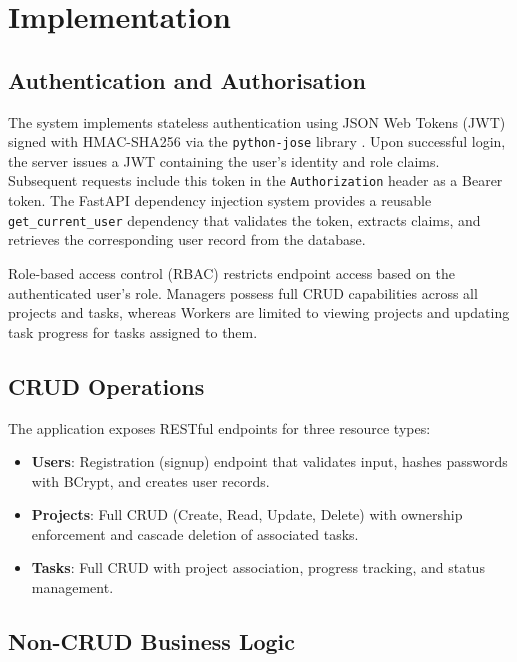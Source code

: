 \documentclass[conference]{IEEEtran}
\begin{document}
\section{Implementation}
\label{sec:implementation}

\subsection{Authentication and Authorisation}

The system implements stateless authentication using JSON Web Tokens (JWT) signed with HMAC-SHA256 via the \texttt{python-jose} library \cite{ietf2015jwt}. Upon successful login, the server issues a JWT containing the user's identity and role claims. Subsequent requests include this token in the \texttt{Authorization} header as a Bearer token. The FastAPI dependency injection system provides a reusable \texttt{get\_current\_user} dependency that validates the token, extracts claims, and retrieves the corresponding user record from the database.

Role-based access control (RBAC) restricts endpoint access based on the authenticated user's role. Managers possess full CRUD capabilities across all projects and tasks, whereas Workers are limited to viewing projects and updating task progress for tasks assigned to them.

\subsection{CRUD Operations}

The application exposes RESTful endpoints for three resource types:

\begin{itemize}[noitemsep]
    \item \textbf{Users}: Registration (signup) endpoint that validates input, hashes passwords with BCrypt, and creates user records.
    \item \textbf{Projects}: Full CRUD (Create, Read, Update, Delete) with ownership enforcement and cascade deletion of associated tasks.
    \item \textbf{Tasks}: Full CRUD with project association, progress tracking, and status management.
\end{itemize}

\subsection{Non-CRUD Business Logic}
\end{document}
